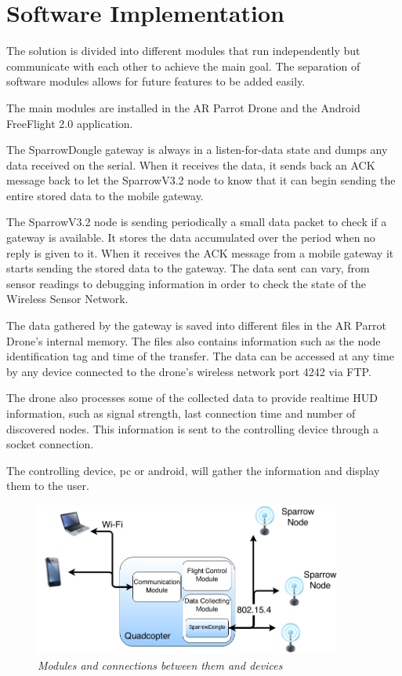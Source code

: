\normalfont\normalsize
\chapter{Software Implementation}

The solution is divided into different modules that run independently  but communicate with each other to achieve the main goal. The separation of software modules allows for future features to be added easily.

The main modules are installed in the AR Parrot Drone and the Android FreeFlight 2.0 application.

The SparrowDongle gateway is always in a listen-for-data state and dumps any data received on the serial. When it receives the data, it sends back an ACK message back to let the SparrowV3.2 node to know that it can begin sending the entire stored data to the mobile gateway.

The SparrowV3.2 node is sending periodically a small data packet to check if a gateway is available. It stores the data accumulated over the period when no reply is given to it. When it receives the ACK message from a mobile gateway it starts sending the stored data to the gateway. The data sent can vary, from sensor readings to debugging information in order to check the state of the Wireless Sensor Network.

The data gathered by the gateway is saved into different files in the AR Parrot Drone's internal memory. The files also contains information such as the node identification tag and time of the transfer. The data can be accessed at any time by any device connected to the drone's wireless network port 4242 via FTP.

The drone also processes some of the collected data to provide realtime HUD information, such as signal strength, last connection time and number of discovered nodes. This information is sent to the controlling device through a socket connection.

The controlling device, pc or android, will gather the information and display them to the user.

\clearpage

\begin{figure}[ht]
\begin{center}
\includegraphics[width=0.9\textwidth]{implementation/organigrama.png}
\end{center}
\caption{\small \itshape{Modules and connections between them and devices}}
\end{figure}

